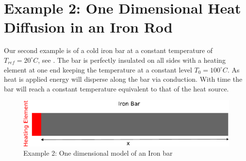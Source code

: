 
%
%
%

\section{Example 2: One Dimensional Heat Diffusion in an Iron Rod}
\label{Sec:1DHDv0}

Our second example is of a cold iron bar at a constant temperature of
$T_{ref}=20^{\circ} C$, see . The bar is
perfectly insulated on all sides with a heating element at one end keeping the
temperature at a constant level $T_0=100^{\circ} C$.  As heat is
applied energy will disperse along the bar via conduction. With time the bar
will reach a constant temperature equivalent to that of the heat source.

\begin{figure}[ht]
\centerline{\includegraphics[width=4.in]{figures/onedheatdiff002}}
\caption{Example 2: One dimensional model of an Iron bar}
\label{fig:onedhdmodel}
\end{figure}

